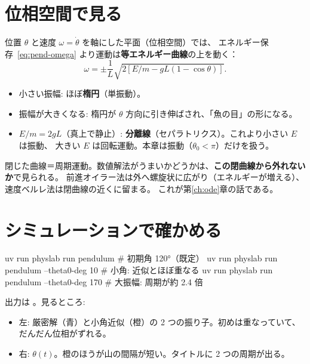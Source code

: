 \section{位相空間で見る}\label{sec:pend-phase}

位置 $\theta$ と速度 $\omega=\dot\theta$ を軸にした平面（位相空間）では、
エネルギー保存~\eqref{eq:pend-omega} より運動は\textbf{等エネルギー曲線}の上を動く：
\begin{equation}
  \omega=\pm\frac1L\sqrt{2\left[E/m-gL(1-\cos\theta)\right]}.
\end{equation}
\begin{itemize}
  \item 小さい振幅: ほぼ\textbf{楕円}（単振動）。
  \item 振幅が大きくなる: 楕円が $\theta$ 方向に引き伸ばされ、「魚の目」の形になる。
  \item $E/m=2gL$（真上で静止）: \textbf{分離線}（セパラトリクス）。これより小さい $E$ は振動、
    大きい $E$ は回転運動。本章は振動（$\theta_0<\pi$）だけを扱う。
\end{itemize}

閉じた曲線＝周期運動。数値解法がうまいかどうかは、\textbf{この閉曲線から外れないか}で見られる。
前進オイラー法は外へ螺旋状に広がり（エネルギーが増える）、速度ベルレ法は閉曲線の近くに留まる。
これが第\ref{ch:ode}章の話である。

\section{シミュレーションで確かめる}\label{sec:pend-sim}

\begin{simbox}
\begin{terminal}
uv run physlab run pendulum                      # 初期角 120°（既定）
uv run physlab run pendulum --theta0-deg 10      # 小角: 近似とほぼ重なる
uv run physlab run pendulum --theta0-deg 170     # 大振幅: 周期が約 2.4 倍
\end{terminal}
\end{simbox}

出力は 。見るところ:
\begin{itemize}
  \item 左: 厳密解（青）と小角近似（橙）の 2 つの振り子。初めは重なっていて、だんだん位相がずれる。
  \item 右: $\theta(t)$。橙のほうが山の間隔が短い。タイトルに 2 つの周期が出る。
\end{itemize}

